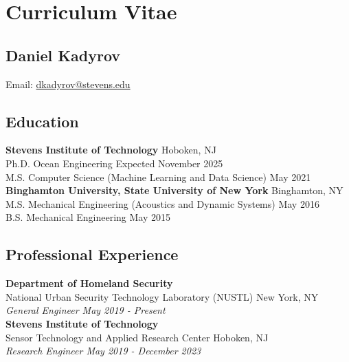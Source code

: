 \chapter{Curriculum Vitae}
\begin{singlespace}
\footnotesize %
\setlength{\parindent}{0pt} %
\setlength{\parskip}{0pt}   %
\setlength{\itemsep}{0pt}   %
\setlength{\parsep}{0pt}    %
\setlength{\topsep}{0pt}    %
\setlength{\partopsep}{0pt} %

\section*{Daniel Kadyrov}

Email: \href{mailto:dkadyrov@stevens.edu}{dkadyrov@stevens.edu}\\

\section*{Education}
\textbf{Stevens Institute of Technology} \hfill Hoboken, NJ \\
Ph.D. Ocean Engineering \hfill Expected November 2025 \\
M.S. Computer Science (Machine Learning and Data Science) \hfill May 2021 \\

\textbf{Binghamton University, State University of New York} \hfill Binghamton, NY \\
M.S. Mechanical Engineering (Acoustics and Dynamic Systems) \hfill May 2016 \\
B.S. Mechanical Engineering \hfill May 2015 \\

\section*{Professional Experience}

\textbf{Department of Homeland Security}\\
National Urban Security Technology Laboratory (NUSTL) \hfill New York, NY \\
\textit{General Engineer \hfill May 2019 - Present} \\

\textbf{Stevens Institute of Technology}\\
Sensor Technology and Applied Research Center \hfill Hoboken, NJ \\
\textit{Research Engineer \hfill May 2019 - December 2023} \\


\end{singlespace}
